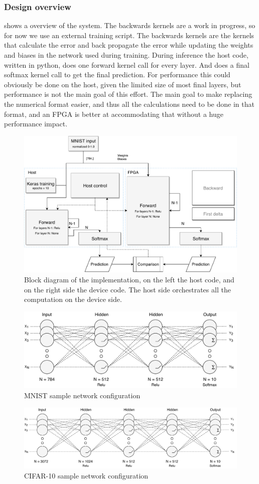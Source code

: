 \documentclass[techrep,english]{ipsj} %
\begin{document}
\subsubsection{Design overview}
 shows a overview of the system.
The backwards kernels are a work in progress, so for now we use an external training script.
The backwards kernels are the kernels that calculate the error and back propagate the error while updating the weights and biases in the network used during training.
During inference the host code, written in python, does one forward kernel call for every layer.
And does a final softmax kernel call to get the final prediction.
For performance this could obviously be done on the host, given the limited size of most final layers, but performance is not the main goal of this effort.
The main goal to make replacing the numerical format easier, and thus all the calculations need to be done in that format, and an FPGA is better at accommodating that without a huge performance impact.

\begin{figure}[p]
  \centering
  \includegraphics[width=0.7\linewidth]{block-diagram.pdf}
  \caption{Block diagram of the implementation, on the left the host code, and on the right side the device code. The host side orchestrates all the computation on the device side.}\label{fig:block-diagram}
\end{figure}

\begin{figure}[p]
  \centering
  \includegraphics[width=0.6\linewidth]{mnist-network.pdf}
  \caption{MNIST sample network configuration}\label{fig:mnist-network}
\end{figure}
\begin{figure}[p]
  \centering
  \includegraphics[width=0.8\linewidth]{cifar10-network.pdf}
  \caption{CIFAR-10 sample network configuration}\label{fig:cifar10-network}
\end{figure}
\end{document}
